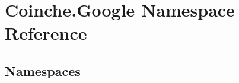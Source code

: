 \hypertarget{namespace_coinche_1_1_google}{}\section{Coinche.\+Google Namespace Reference}
\label{namespace_coinche_1_1_google}
\subsection*{Namespaces}
\begin{DoxyCompactItemize}
\end{DoxyCompactItemize}
